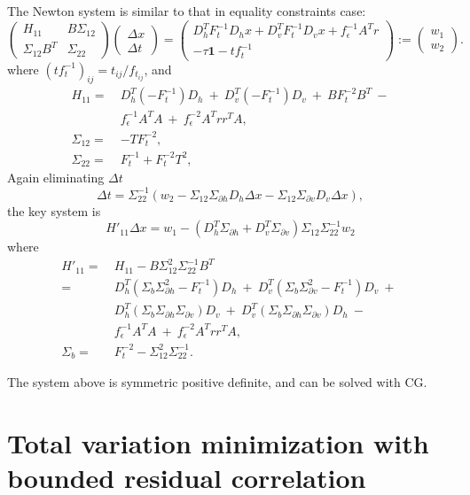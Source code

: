 \documentclass{article}
\newcommand{\bpm}{\left(\begin{matrix}}
\newcommand{\epm}{\end{matrix}\right)}
\newcommand{\dx}{\Delta x}
\newcommand{\dt}{\Delta t}
\newcommand{\<}{\langle}
\renewcommand{\>}{\rangle}
\begin{document}
The Newton system is similar to that in equality constraints case:
\[ 
\bpm H_{11} & B\Sigma_{12} \\
\Sigma_{12}B^T & \Sigma_{22} \epm
\bpm \dx \\ \dt \epm =
\bpm D_h^T F_t^{-1}D_h x + D_v^TF_t^{-1}D_v x + f_\epsilon^{-1}A^Tr \\
-\tau\mathbf{1} - tf^{-1}_t \epm :=
\bpm w_1 \\ w_2 \epm.
\]
where $(tf^{-1}_t)_{ij} = t_{ij}/f_{t_{ij}}$, and 
\begin{align*}
H_{11} = ~& D_h^T(-F_t^{-1})D_h ~+~ D_v^T(-F_t^{-1})D_v ~+~ B F_t^{-2}B^T ~- \\
 & f_\epsilon^{-1} A^TA ~+~ f_\epsilon^{-2} A^Trr^TA, \\
\Sigma_{12} = ~& -TF_t^{-2}, \\
\Sigma_{22} = ~& F_t^{-1} + F_t^{-2}T^2,
\end{align*}
Again eliminating $\dt$
\[
\dt = \Sigma_{22}^{-1}(w_2 - \Sigma_{12}\Sigma_{\partial h}D_h\dx - \Sigma_{12}\Sigma_{\partial v}D_v\dx),
\]
the key system is
\[
H'_{11}\dx  = 
w_1 - (D_h^T\Sigma_{\partial h} + D_v^T\Sigma_{\partial v} )\Sigma_{12}\Sigma_{22}^{-1}w_2
\]
where
\begin{align*}
H'_{11} = ~& H_{11} - B\Sigma^2_{12}\Sigma_{22}^{-1}B^T \\
= ~& D_h^T(\Sigma_b\Sigma^2_{\partial h}-F_t^{-1})D_h ~+~
D_v^T(\Sigma_b\Sigma^2_{\partial v}-F_t^{-1})D_v ~+~\\
~& D_h^T(\Sigma_b\Sigma_{\partial h}\Sigma_{\partial v})D_v ~+~
D_v^T(\Sigma_b\Sigma_{\partial h}\Sigma_{\partial v})D_h ~-~ \\
~& f_\epsilon^{-1} A^TA ~+~ f_\epsilon^{-2} A^Trr^TA, \\
\Sigma_b = ~& F_t^{-2} - \Sigma_{12}^2\Sigma_{22}^{-1}.
\end{align*}

The system above is symmetric positive definite, and can be solved with CG.


\section{Total variation minimization with bounded residual correlation}
\label{sec:tvdantzig}
\end{document}
